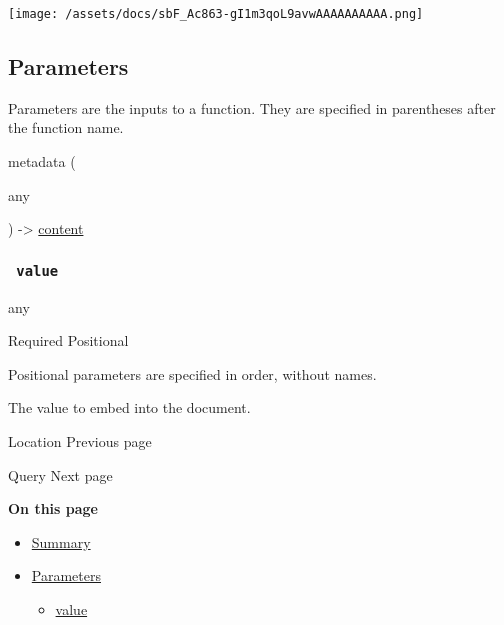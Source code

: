\texttt{[image: /assets/docs/sbF\_Ac863-gI1m3qoL9avwAAAAAAAAAA.png]}

\subsection{\texorpdfstring{{ Parameters
}}{ Parameters }}\label{parameters}

\label{parameters-tooltip}
Parameters are the inputs to a function. They are specified in
parentheses after the function name.

{ metadata } (

{ { any } }

) -\textgreater{} \href{/docs/reference/foundations/content/}{content}

\subsubsection{\texorpdfstring{\texttt{\ value\ }}{ value }}\label{parameters-value}

{ any }

{Required} {{ Positional }}

\label{parameters-value-positional-tooltip}
Positional parameters are specified in order, without names.

The value to embed into the document.

\href{/docs/reference/introspection/location/}{\pandocbounded{}}

{ Location } { Previous page }

\href{/docs/reference/introspection/query/}{\pandocbounded{}}

{ Query } { Next page }

\textbf{On this page}

\begin{itemize}
\tightlist
\item
  \hyperref[summary]{Summary}
\item
  \hyperref[parameters]{Parameters}

  \begin{itemize}
  \tightlist
  \item
    \hyperref[parameters-value]{value}
  \end{itemize}
\end{itemize}

